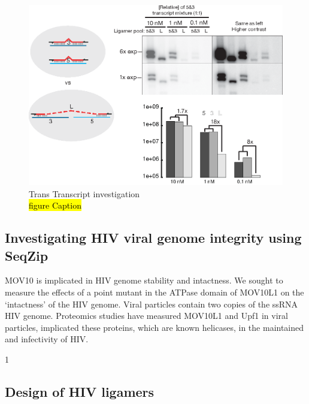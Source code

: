   	\begin{figure}[htbp] %
    	\centering 
    	\includegraphics{Figures/Chapter2/TransRNAWithSeqZip.eps}
    	\caption[Trans Transcript investigation]
    	{
	      Trans Transcript investigation\\
  	    \hl{figure Caption}
		    }
   	 \label{fig:Ligation product and RNA integrity}
	 	 \end{figure}

  \subsection{Investigating HIV viral genome integrity using SeqZip}\label{subsec: HIV}


  	MOV10 is implicated in HIV genome stability and intactness. We sought to measure the effects of a point mutant in the ATPase domain of MOV10L1 on the ‘intactness’ of the HIV genome. Viral particles contain two copies of the ssRNA HIV genome. Proteomics studies have measured MOV10L1 and Upf1 in viral particles, implicated these proteins, which are known helicases, in the maintained and infectivity of HIV.

1	\subsection{Design of HIV ligamers}

